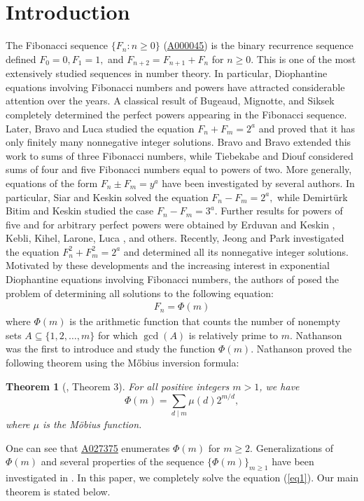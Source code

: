 \documentclass[10pt,a4paper]{amsart}
\newtheorem{theorem}{Theorem}[section]
\begin{document}
\section{\protect\bigskip Introduction}
The Fibonacci sequence $\{F_n:n\geq0\}$ (\href{https://oeis.org/A000045}{\underline{A000045}}) is the binary recurrence sequence defined $F_0=0,F_1=1,$ and $ F_{n+2}=F_{n+1}+F_n$ for $n\geq0$. This is one of the most extensively studied sequences in number theory. In particular, Diophantine equations involving Fibonacci numbers and powers have attracted considerable attention over the years. A classical result of Bugeaud, Mignotte, and Siksek \cite{r4} completely determined the perfect powers appearing in the Fibonacci sequence. Later, Bravo and Luca \cite{r3} studied the equation $F_n+F_m=2^a$
and proved that it has only finitely many nonnegative integer solutions. Bravo and Bravo \cite{r1} extended this work to sums of three Fibonacci numbers, while Tiebekabe and Diouf \cite{r15,r16} considered sums of four and five Fibonacci numbers equal to powers of two. More generally, equations of the form $F_n\pm F_m=y^a$ have been investigated by several authors. In particular, Siar and Keskin \cite{r14} solved the equation $F_n-F_m=2^a,$
while Demirtürk Bitim and Keskin \cite{r6} studied the case $F_n-F_m=3^a.$
Further results for powers of five and for arbitrary perfect powers were obtained by Erduvan and Keskin \cite{r8}, Kebli, Kihel, Larone, Luca \cite{r10,r11}, and others. Recently, Jeong and Park \cite{r9} investigated the equation
$F_n^2+F_m^2=2^a$ and determined all its nonnegative integer solutions. Motivated by these developments and the increasing interest in exponential Diophantine equations involving Fibonacci numbers, the authors of \cite{Tmm} posed the problem of determining all solutions to the following equation:
\begin{align*}\label{eq1}
 F_n=\Phi(m)\tag{1}   
\end{align*}
where $\Phi(m)$ is the arithmetic function that counts the number of nonempty sets $A \subseteq \{1, 2, \dots, m\}$ for which $\gcd(A)$ is relatively prime to $m$.
Nathanson \cite{Nath} was the first to introduce and study the function $\Phi(m)$. Nathanson \cite{Nath} proved the following theorem using the M\H{o}bius inversion formula:

\begin{theorem}[\cite{Nath}, Theorem 3] \label{Nathanson Theorem}For all positive integers $m>1$, we have
    $$\Phi(m) = \sum_{d \mid m} \mu(d) 2^{m/d},$$
    where $\mu$ is the Möbius function. 
\end{theorem}
\noindent One can see that \href{https://oeis.org/A027375}{\underline{A027375}} enumerates $\Phi(m)$ for $m\geq2$. Generalizations of $\Phi(m)$ and several properties of the sequence $\{\Phi(m)\}_{m\geq1}$ have been investigated in \cite{T1,T2,T3,T4,Tmm,T5,T6}.
In this paper, we completely solve the equation (\ref{eq1}). Our main theorem is stated below. 
\end{document}
